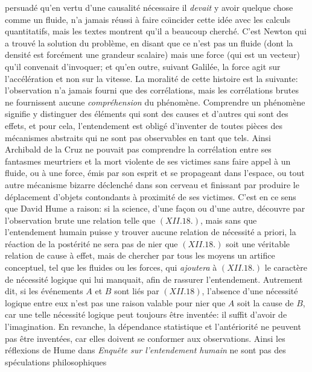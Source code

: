 persuad\'e qu'en vertu d'une causalit\'e n\'ecessaire il {\it devait} y 
avoir quelque chose comme un fluide, n'a jamais r\'eussi \`a faire 
co{\"\i}ncider cette id\'ee avec les calculs quantitatifs, mais les
textes montrent qu'il a beaucoup cherch\'e. C'est Newton qui a trouv\'e 
la solution du probl\`eme, en disant que ce n'est pas un fluide (dont la 
densit\'e est forc\'ement une grandeur scalaire) mais une force (qui 
est un vecteur) qu'il convenait d'invoquer; et qu'en outre, suivant 
Galil\'ee, la force agit sur l'acc\'el\'eration et non sur la vitesse. 
\medskip
La moralit\'e de cette histoire est la suivante: l'observation n'a
jamais fourni que des corr\'elations, mais les corr\'elations brutes
ne fournissent aucune {\it compr\'ehension} du ph\'enom\`ene. 
Comprendre un ph\'enom\`ene signifie y distinguer des \'el\'ements
qui sont des causes et d'autres qui sont des effets, et pour cela, 
l'entendement est oblig\'e d'inventer de toutes pi\`eces des 
m\'ecanismes abstraits qui ne sont pas observables en tant que 
tels. Ainsi Archibald de la Cruz ne pouvait pas comprendre la 
corr\'elation entre ses fantasmes meurtriers et la mort violente de
ses victimes sans faire appel \`a un fluide, ou \`a une force, \'emis par 
son esprit et se propageant dans l'espace, ou tout autre m\'ecanisme 
bizarre d\'eclench\'e dans son cerveau et finissant par produire le 
d\'eplacement d'objets contondants \`a proximit\'e de ses victimes. 
C'est en ce sens que David Hume a raison: si la science, d'une fa\c{c}on 
ou d'une autre, d\'ecouvre par l'observation brute une relation telle
que $(XII.18.)$, mais sans que l'entendement humain puisse y trouver 
aucune relation de n\'ecessit\'e a priori, la r\'eaction de la 
post\'erit\'e ne sera pas de nier que $(XII.18.)$ soit une v\'eritable 
relation de cause \`a effet, mais de chercher par tous les moyens un 
artifice conceptuel, tel que les fluides ou les forces, qui {\it ajoutera} 
\`a $(XII.18.)$ le caract\`ere de n\'ecessit\'e logique qui lui manquait, 
afin de rassurer l'entendement. Autrement dit, si les \'ev\'enements 
$A$ et $B$ sont li\'es par $(XII.18)$,  l'absence d'une n\'ecessit\'e 
logique entre eux n'est pas une raison valable pour nier que $A$ soit
la cause de $B$, car une telle n\'ecessit\'e logique peut toujours
\^etre invent\'ee: il suffit d'avoir de l'imagination. En revanche, la 
d\'ependance statistique et l'ant\'eriorit\'e ne peuvent pas \^etre 
invent\'ees, car elles doivent se conformer aux observations. 
\medskip 
Ainsi les r\'eflexions de Hume dans {\it Enqu\^ete sur 
l'entendement humain} ne sont pas des sp\'eculations philosophiques

